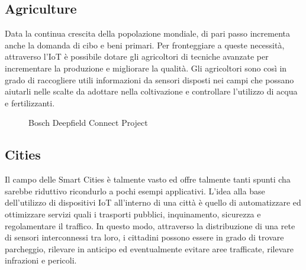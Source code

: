 \subsection{Agriculture}
Data la continua crescita della popolazione mondiale, di pari passo incrementa anche la domanda di cibo e beni primari. Per fronteggiare a queste necessità, attraverso l'IoT è possibile dotare gli agricoltori di tecniche avanzate per incrementare la produzione e migliorare la qualità.
Gli agricoltori sono così in grado di raccogliere utili informazioni da sensori disposti nei campi che possano aiutarli nelle scalte da adottare nella coltivazione e controllare l'utilizzo di acqua e fertilizzanti.
\begin{figure}%
	\centering
	\qquad
	\caption{Bosch Deepfield Connect Project}%
	\label{fig:application_bosch}%
\end{figure}
\subsection{Cities}
Il campo delle Smart Cities è talmente vasto ed offre talmente tanti spunti cha sarebbe riduttivo ricondurlo a pochi esempi applicativi. L'idea alla base dell'utilizzo di dispositivi IoT all'interno di una città è quello di automatizzare ed ottimizzare servizi quali i trasporti pubblici, inquinamento, sicurezza e regolamentare il traffico.
In questo modo, attraverso la distribuzione di una rete di sensori interconnessi tra loro, i cittadini possono essere in grado di trovare parcheggio, rilevare in anticipo ed eventualmente evitare aree trafficate, rilevare infrazioni e pericoli.
